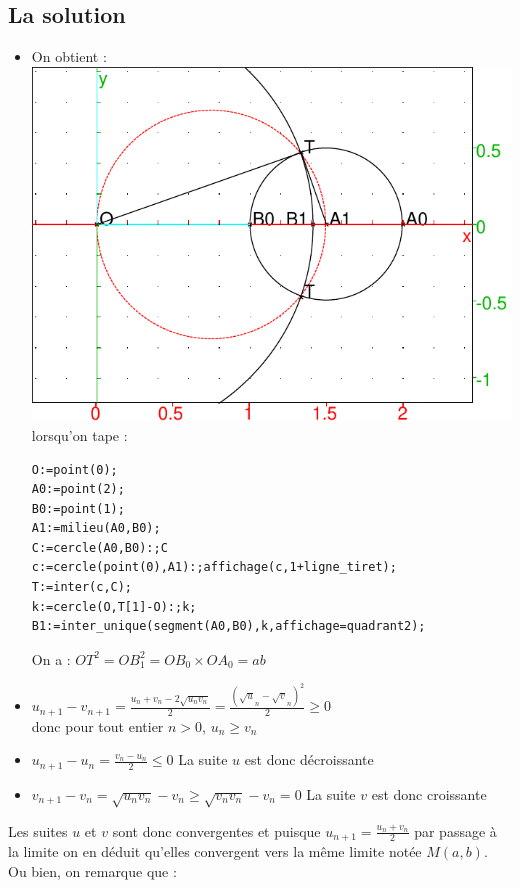 \documentclass[a4paper,11pt]{book}
\begin{document}
\subsection{La solution}
\begin{itemize}
\item On obtient :\\
\includegraphics[width=\textwidth]{exomean}\\
lorsqu'on tape :
\begin{verbatim}
O:=point(0);
A0:=point(2);
B0:=point(1);
A1:=milieu(A0,B0);
C:=cercle(A0,B0):;C
c:=cercle(point(0),A1):;affichage(c,1+ligne_tiret);
T:=inter(c,C);
k:=cercle(O,T[1]-O):;k;
B1:=inter_unique(segment(A0,B0),k,affichage=quadrant2);
\end{verbatim}
On a : $OT^2=OB_1^2=OB_0\times OA_0=ab$
\item $\displaystyle u_{n+1}-v_{n+1}=\frac{u_n+v_n-2\sqrt{u_nv_n} }{2}=\frac{(\sqrt u_n-\sqrt v_n)^2}{2}\geq 0$\\
donc pour tout entier $n>0$, $u_n\geq v_n$
\item $u_{n+1}-u_n=\frac{v_n-u_n}{2}\leq 0$
La suite $u$ est donc d\'ecroissante 
\item $v_{n+1}-v_n=\sqrt{u_nv_n}-v_n\geq \sqrt{v_nv_n}-v_n=0$
La suite $v$ est donc croissante
\end{itemize}
Les suites $u$ et $v$ sont donc convergentes et puisque 
$\displaystyle u_{n+1}=\frac{u_n+v_n}{2}$ par passage \`a la limite on en 
d\'eduit qu'elles convergent vers la m\^eme limite not\'ee $M(a,b)$.\\
Ou bien, on remarque que :\\
\end{document}

